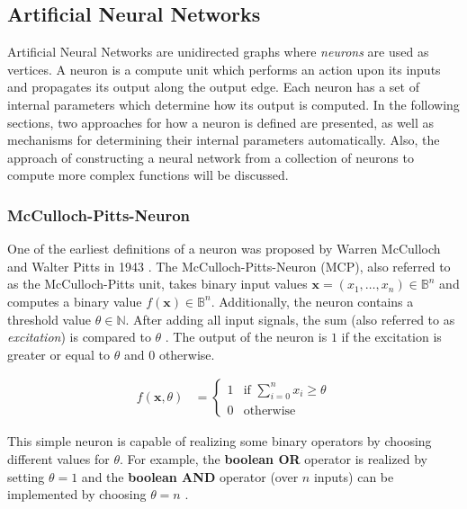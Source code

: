 \subsection{Artificial Neural Networks}
Artificial Neural Networks are unidirected graphs where \textit{neurons} are used as vertices.
A neuron is a compute unit which performs an action upon its inputs and propagates its output along the output edge.
Each neuron has a set of internal parameters which determine how its output is computed.
In the following sections, two approaches for how a neuron is defined are presented, as well as mechanisms for determining their internal parameters automatically.
Also, the approach of constructing a neural network from a collection of neurons to compute more complex functions will be discussed.

\subsubsection{McCulloch-Pitts-Neuron}
\label{sec:mcculloch-pitts}
One of the earliest definitions of a neuron was proposed by Warren McCulloch and Walter Pitts in 1943 \cite{mcculloch_logical_1943}.
The McCulloch-Pitts-Neuron (MCP), also referred to as the McCulloch-Pitts unit, takes binary input values $\bm{x} = (x_1, \dots, x_n) \in \mathbb{B}^n$ and computes a binary value $f(\bm{x}) \in \mathbb{B}^n$.
Additionally, the neuron contains a threshold value $\theta \in \mathbb{N}$.
After adding all input signals, the sum (also referred to as \textit{excitation}) is compared to $\theta$ .
The output of the neuron is $1$ if the excitation is greater or equal to $\theta$ and $0$ otherwise.

\begin{equation}
    \begin{split}
        \label{eq:mcculloch-binary}
        f(\bm{x}, \theta)
        &=
        \begin{cases}
            1 & \text{if } \sum_{i=0}^n x_i \geq \theta \\
            0 & \text{otherwise}
        \end{cases}
    \end{split}
\end{equation}

This simple neuron is capable of realizing some binary operators by choosing different values for $\theta$.
For example, the \textbf{boolean OR} operator is realized by setting $\theta = 1$ and the \textbf{boolean AND} operator (over $n$ inputs) can be implemented by choosing $\theta = n$ \cite{rojas_neural_1996}.


